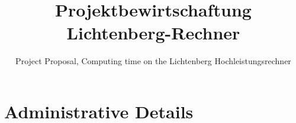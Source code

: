 \documentclass[accentcolor=tud9c,nochapname,11pt]{tudexercise}
\begin{document}
\title{Projektbewirtschaftung \\ Lichtenberg-Rechner}
\subtitle{Project Proposal, Computing time on the Lichtenberg Hochleistungsrechner}
\maketitle
\renewcommand{\footrulewidth}{1pt}
\fancyfoot{} %
\fancyfoot[LE,RO]{\thepage}           %
\section{Administrative Details}
\end{document}
